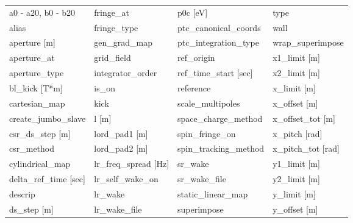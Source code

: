  \begin{tabular}{llll} \toprule
a0 - a20, b0 - b20               & fringe_at                        & p0c [eV]                         & type                             \\
alias                            & fringe_type                      & ptc_canonical_coords             & wall                             \\
aperture [m]                     & gen_grad_map                     & ptc_integration_type             & wrap_superimpose                 \\
aperture_at                      & grid_field                       & ref_origin                       & x1_limit [m]                     \\
aperture_type                    & integrator_order                 & ref_time_start [sec]             & x2_limit [m]                     \\
bl_kick [T*m]                    & is_on                            & reference                        & x_limit [m]                      \\
cartesian_map                    & kick                             & scale_multipoles                 & x_offset [m]                     \\
create_jumbo_slave               & l [m]                            & space_charge_method              & x_offset_tot [m]                 \\
csr_ds_step [m]                  & lord_pad1 [m]                    & spin_fringe_on                   & x_pitch [rad]                    \\
csr_method                       & lord_pad2 [m]                    & spin_tracking_method             & x_pitch_tot [rad]                \\
cylindrical_map                  & lr_freq_spread [Hz]              & sr_wake                          & y1_limit [m]                     \\
delta_ref_time [sec]             & lr_self_wake_on                  & sr_wake_file                     & y2_limit [m]                     \\
descrip                          & lr_wake                          & static_linear_map                & y_limit [m]                      \\
ds_step [m]                      & lr_wake_file                     & superimpose                      & y_offset [m]                     \\

\end{tabular}

